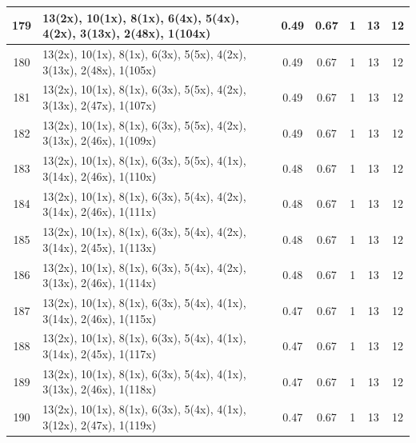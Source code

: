 \begin{small}
\begin{longtable}{|c|p{4cm}|c|c|c|c|c|}
  179 & 13(2x), 10(1x), 8(1x), 6(4x), 5(4x), 4(2x), 3(13x), 2(48x), 1(104x) & \cellcolor{colorGood}  0.49 & \cellcolor{colorGood} 0.67 & 1 & 13 & \cellcolor{colorGood} 12 \\   \hline
  180 & 13(2x), 10(1x), 8(1x), 6(3x), 5(5x), 4(2x), 3(13x), 2(48x), 1(105x) & \cellcolor{colorGood}  0.49 & \cellcolor{colorGood} 0.67 & 1 & 13 & \cellcolor{colorGood} 12 \\   \hline
  181 & 13(2x), 10(1x), 8(1x), 6(3x), 5(5x), 4(2x), 3(13x), 2(47x), 1(107x) & \cellcolor{colorGood}  0.49 & \cellcolor{colorGood} 0.67 & 1 & 13 & \cellcolor{colorGood} 12 \\   \hline
  182 & 13(2x), 10(1x), 8(1x), 6(3x), 5(5x), 4(2x), 3(13x), 2(46x), 1(109x) & \cellcolor{colorGood}  0.49 & \cellcolor{colorGood} 0.67 & 1 & 13 & \cellcolor{colorGood} 12 \\   \hline
  183 & 13(2x), 10(1x), 8(1x), 6(3x), 5(5x), 4(1x), 3(14x), 2(46x), 1(110x) & \cellcolor{colorGood}  0.48 & \cellcolor{colorGood} 0.67 & 1 & 13 & \cellcolor{colorGood} 12 \\   \hline
  184 & 13(2x), 10(1x), 8(1x), 6(3x), 5(4x), 4(2x), 3(14x), 2(46x), 1(111x) & \cellcolor{colorGood}  0.48 & \cellcolor{colorGood} 0.67 & 1 & 13 & \cellcolor{colorGood} 12 \\   \hline
  185 & 13(2x), 10(1x), 8(1x), 6(3x), 5(4x), 4(2x), 3(14x), 2(45x), 1(113x) & \cellcolor{colorGood}  0.48 & \cellcolor{colorGood} 0.67 & 1 & 13 & \cellcolor{colorGood} 12 \\   \hline
  186 & 13(2x), 10(1x), 8(1x), 6(3x), 5(4x), 4(2x), 3(13x), 2(46x), 1(114x) & \cellcolor{colorGood}  0.48 & \cellcolor{colorGood} 0.67 & 1 & 13 & \cellcolor{colorGood} 12 \\   \hline
  187 & 13(2x), 10(1x), 8(1x), 6(3x), 5(4x), 4(1x), 3(14x), 2(46x), 1(115x) & \cellcolor{colorGood}  0.47 & \cellcolor{colorGood} 0.67 & 1 & 13 & \cellcolor{colorGood} 12 \\   \hline
  188 & 13(2x), 10(1x), 8(1x), 6(3x), 5(4x), 4(1x), 3(14x), 2(45x), 1(117x) & \cellcolor{colorGood}  0.47 & \cellcolor{colorGood} 0.67 & 1 & 13 & \cellcolor{colorGood} 12 \\   \hline
  189 & 13(2x), 10(1x), 8(1x), 6(3x), 5(4x), 4(1x), 3(13x), 2(46x), 1(118x) & \cellcolor{colorGood}  0.47 & \cellcolor{colorGood} 0.67 & 1 & 13 & \cellcolor{colorGood} 12 \\   \hline
  190 & 13(2x), 10(1x), 8(1x), 6(3x), 5(4x), 4(1x), 3(12x), 2(47x), 1(119x) & \cellcolor{colorGood}  0.47 & \cellcolor{colorGood} 0.67 & 1 & 13 & \cellcolor{colorGood} 12 \\   \hline

\end{longtable}
\end{small}
